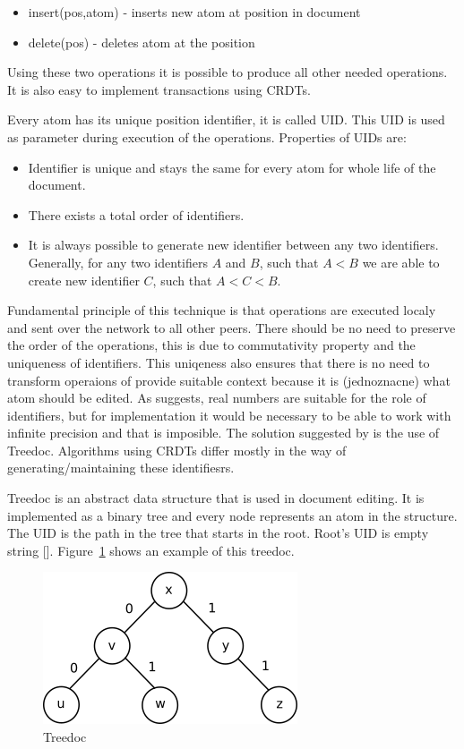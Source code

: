 \documentclass[12pt,oneside]{fithesis2}
\begin{document}
\begin{itemize}
\item insert(pos,atom) - inserts new atom at position in document
\item delete(pos) - deletes atom at the position 
\end{itemize}
Using these two operations it is possible to produce all other needed operations. It is also easy to implement transactions using CRDTs. 
\par Every atom has its unique position identifier, it is called UID. This UID is used as parameter during execution of the operations. Properties of UIDs are:
\begin{itemize}
\item Identifier is unique and stays the same for every atom for whole life of the document.
\item There exists a total order of identifiers.
\item It is always possible to generate new identifier between any two identifiers. Generally, for any two identifiers \(A\) and \(B\), such that \(A < B\) we are able to create new identifier \(C\), such that \(A < C < B\).
\end{itemize}
Fundamental principle of this technique is that operations are executed localy and sent over the network to all other peers. There should be no need to preserve the order of the operations, this is due to commutativity property and the uniqueness of identifiers. This uniqeness also ensures that there is no need to transform operaions of provide suitable context because it is (jednoznacne) what atom should be edited.
As \cite{Shapiro-design} suggests, real numbers are suitable for the role of identifiers, but for implementation it would be necessary to be able to work with infinite precision and that is imposible. The solution suggested by \cite{Shapiro-design} is the use of Treedoc. Algorithms using CRDTs differ mostly in the way of generating/maintaining these identifiesrs.
\par Treedoc is an abstract data structure that is used in document editing. It is implemented as a binary tree and every node represents an atom in the structure. The UID is the path in the tree that starts in the root. Root's UID is empty string []. Figure~\ref{fig:treedoc} shows an example of this treedoc.
\begin{figure}[H]
\caption{Treedoc}
\label{fig:treedoc}
\centering
\vspace{5mm}
\includegraphics{treedoc1} 
\end{figure}
\end{document}
